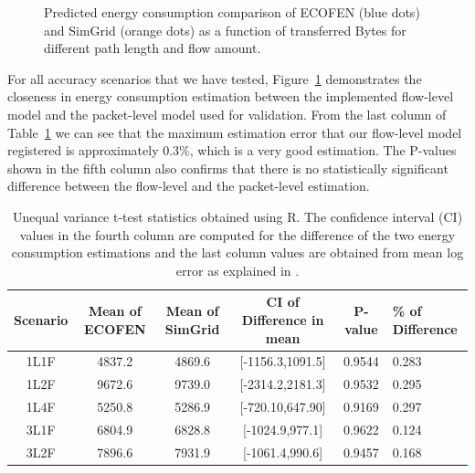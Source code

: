 \begin{figure}[htbp]
	\caption{Predicted energy consumption comparison of ECOFEN (blue dots) and SimGrid (orange dots) as a function of transferred Bytes for different path length and flow amount.}
	\label{fig:sgvsns3scenario}
\end{figure}
For all accuracy scenarios that we have tested, Figure~\ref{fig:sgvsns3scenario} demonstrates the closeness in energy consumption estimation between the implemented flow-level model and the packet-level model used for validation. From the last column of Table~\ref{table:welchtest} we can see that the maximum estimation error that our flow-level model registered is approximately 0.3\%, which is a very good estimation. The P-values shown in the fifth column also confirms that there is no statistically significant difference between the flow-level and the packet-level estimation.
\begin{table}
		\caption{Unequal variance t-test statistics obtained using R. The confidence interval (CI) values in the fourth column are computed for the difference of the two energy consumption estimations and the last column values are obtained from mean log error as explained in \cite{DBLP:journals/tomacs/VelhoSCL13}.}
		\label{table:welchtest}
	\begin{tabular}{cccccl} 
		\toprule 
		\textbf{Scenario} &	\textbf{Mean of ECOFEN}&\textbf{Mean of SimGrid} & \textbf{CI  of Difference in mean} & \textbf{P-value}& \textbf{\% of Difference}\\ 
		\midrule 
		1L1F&4837.2&4869.6&[-1156.3,1091.5]&0.9544&0.283\\	
		1L2F& 9672.6&9739.0& [-2314.2,2181.3]&0.9532&0.295\\ 		
		1L4F&5250.8&5286.9& [-720.10,647.90]&0.9169&0.297\\ 			 
		3L1F&6804.9&6828.8& [-1024.9,977.1]&0.9622&0.124\\ 	
		3L2F&7896.6& 7931.9& [-1061.4,990.6]&0.9457&0.168\\ 
		\bottomrule		
	\end{tabular} 

\end{table}

